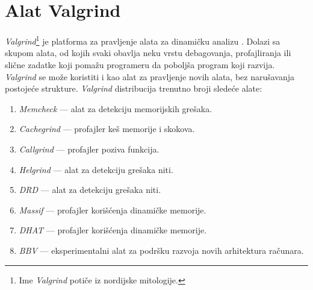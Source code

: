 \documentclass[12pt,oneside]{memoir}
\theoremstyle{plain}
\theoremstyle{definition}
\begin{document}
\chapter{Alat Valgrind}
\textit{Valgrind}\footnote{ Ime \textit{Valgrind} potiče iz nordijske mitologije.} je platforma za pravljenje alata za dinamičku analizu \cite{Valgrind}. Dolazi sa skupom alata, od kojih svaki obavlja neku vrstu debagovanja, profajliranja ili slične zadatke koji pomažu programeru da poboljša program koji razvija. \textit{Valgrind} se može koristiti i kao alat za pravljenje novih alata, bez narušavanja postojeće strukture. 
\textit{Valgrind} distribucija trenutno broji sledeće alate:
\begin{enumerate}
  \item \textit{Memcheck} \cite{ValgrindDOC} --- alat za detekciju memorijskih grešaka.
  \item \textit{Cachegrind}  \cite{Cachegrind} --- profajler keš memorije i skokova. 
  \item \textit{Callgrind} \cite{Callgrind} --- profajler poziva funkcija.
  \item \textit{Helgrind} \cite{Helgrind} --- alat za detekciju grešaka niti.
  \item \textit{DRD} \cite{Drd} --- alat za detekciju grešaka niti. 
  \item \textit{Massif} \cite{Massif} --- profajler korišćenja dinamičke memorije.
  \item \textit{DHAT} \cite{DHAT} --- profajler korišćenja dinamičke memorije. %
  \item \textit{BBV} \cite{BBV} --- eksperimentalni alat za podršku razvoja novih arhitektura računara. %
\end{enumerate}
\end{document}
